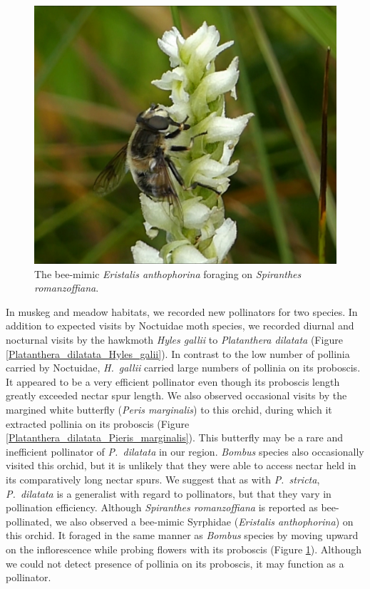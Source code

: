 \begin{multicols}{2}
\begin{figure}[H]
\begin{center}
\vspace{2mm}
\includegraphics[width=\textwidth]{img/Spiranthes_romanzoffiana_Eristalis_anthophorina.jpg}
\caption{The bee-mimic \emph{Eristalis anthophorina} foraging on \emph{Spiranthes romanzoffiana}.}
\label{Spiranthes_romanzoffiana_Eristalis_anthophorina}
\end{center}
\end{figure}



In muskeg and meadow habitats, we recorded new pollinators for two
species. In addition to expected visits by Noctuidae moth species, we
recorded diurnal and nocturnal visits by the hawkmoth \emph{Hyles
gallii} to \emph{Platanthera dilatata} (Figure \ref{Platanthera_dilatata_Hyles_galii}). In contrast to the
low number of pollinia carried by Noctuidae, \emph{H.\ gallii} carried
large numbers of pollinia on its proboscis. It appeared to be a very
efficient pollinator even though its proboscis length greatly exceeded
nectar spur length. We also observed occasional visits by the margined
white butterfly (\emph{Peris marginalis}) to this orchid, during which
it extracted pollinia on its proboscis (Figure \ref{Platanthera_dilatata_Pieris_marginalis}). This butterfly may
be a rare and inefficient pollinator of \emph{P.\ dilatata} in our
region. \emph{Bombus} species also occasionally visited this orchid, but it is
unlikely that they were able to access nectar held in its comparatively
long nectar spurs. We suggest that as with \emph{P.\ stricta},
\emph{P.\ dilatata} is a generalist with regard to pollinators, but that
they vary in pollination efficiency. Although \emph{Spiranthes
romanzoffiana} is reported as bee-pollinated, we also observed a
bee-mimic Syrphidae (\emph{Eristalis anthophorina}) on this orchid. It
foraged in the same manner as \emph{Bombus} species by moving upward on
the inflorescence while probing flowers with its proboscis (Figure \ref{Spiranthes_romanzoffiana_Eristalis_anthophorina}).
Although we could not detect presence of pollinia on its proboscis, it
may function as a pollinator.





\end{multicols}
